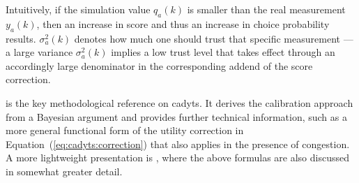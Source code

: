 Intuitively, if the simulation value $q_a(k)$ is smaller than the real measurement 
$y_a(k)$, then an increase in score and thus an increase in choice 
probability results. 
$\sigma^2_a(k)$ denotes how much one should trust that specific measurement
---a large variance $\sigma^2_a(k)$ implies a low trust level that takes effect through
an accordingly large denominator in the corresponding addend of the score correction.

\citet[][]{floetteroed-2010e} is the key methodological reference on \gls{cadyts}.
It derives the calibration approach from a Bayesian argument and provides
further technical information, such as a more general functional form of the utility
correction in Equation~(\ref{eq:cadyts:correction}) that also applies in the presence
of congestion. A more lightweight presentation is 
\citet[][]{FloetteroedChenEtAl2011BehavioralCalibAndAnaNETS}, where the above
formulas are also discussed in somewhat greater detail.

